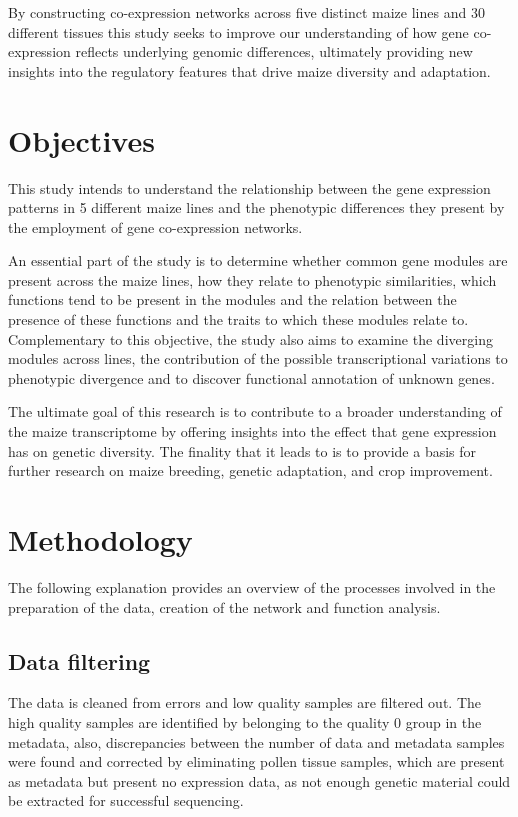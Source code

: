 \documentclass[
]{article}
\begin{document}
By constructing co-expression networks across five distinct maize lines
and 30 different tissues this study seeks to improve our understanding
of how gene co-expression reflects underlying genomic differences,
ultimately providing new insights into the regulatory features that
drive maize diversity and adaptation.

\hypertarget{objectives}{%
\section{Objectives}\label{objectives}}

This study intends to understand the relationship between the gene
expression patterns in 5 different maize lines and the phenotypic
differences they present by the employment of gene co-expression
networks.

An essential part of the study is to determine whether common gene
modules are present across the maize lines, how they relate to
phenotypic similarities, which functions tend to be present in the
modules and the relation between the presence of these functions and the
traits to which these modules relate to. Complementary to this
objective, the study also aims to examine the diverging modules across
lines, the contribution of the possible transcriptional variations to
phenotypic divergence and to discover functional annotation of unknown
genes.

The ultimate goal of this research is to contribute to a broader
understanding of the maize transcriptome by offering insights into the
effect that gene expression has on genetic diversity. The finality that
it leads to is to provide a basis for further research on maize
breeding, genetic adaptation, and crop improvement.

\hypertarget{methodology}{%
\section{Methodology}\label{methodology}}

The following explanation provides an overview of the processes involved
in the preparation of the data, creation of the network and function
analysis.

\hypertarget{data-filtering}{%
\subsection{Data filtering}\label{data-filtering}}

The data is cleaned from errors and low quality samples are filtered
out. The high quality samples are identified by belonging to the quality
0 group in the metadata, also, discrepancies between the number of data
and metadata samples were found and corrected by eliminating pollen
tissue samples, which are present as metadata but present no expression
data, as not enough genetic material could be extracted for successful
sequencing.
\end{document}
